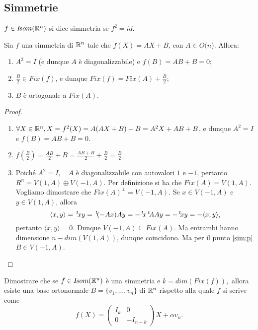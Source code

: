  
\subsection{Simmetrie}
 
 \begin{definition}
	$f\in I\!som( \mathbb R^n)$ si dice simmetria se $f^2=id$.
\end{definition}
 
 \begin{proposition}
 Sia $f$ una simmetria di $\mathbb R^n$ tale che $f(X)=AX+B$, con $A\in O(n$).
 Allora:
 \begin{enumerate}[label=\bf\Roman*)]
	\item $A^2=I$ (e dunque $A$ è diagonalizzabile) e $f(B)=AB+B=0$;\label{sim:p}
	\item $\frac{B}{2}\in Fix(f)$, e dunque $Fix(f)=Fix(A)+\frac{B}{2}$;
	\item $B$ è ortogonale a $Fix(A)$.
 \end{enumerate}
 \end{proposition}
 
 \begin{proof}
 \begin{enumerate}[label=\bf\Roman*)]
 \item $\forall X\in \mathbb R^n,  X=f^2(X)=A(AX+B)+B=A^2X+AB+B$, e dunque
 $A^2=I$ e $f(B)=AB+B=0$.
 \item $f(\frac{B}{2})=\frac{AB}{2}+B=\frac{AB+B}{2}+\frac{B}{2}=\frac{B}{2}$.
 \item Poiché $A^2=I,\quad A$ è diagonalizzabile con autovalori $1$ e $-1$, pertanto
 $R^n=V(1,A)\oplus V(-1,A)$. Per definizione si ha che $Fix(A)=V(1,A)$.
 Vogliamo dimostrare che $Fix(A)^{\bot}=V(-1,A)$.  Se $x\in V(-1,A)$ e $y\in V(1,A)$, allora 
  \[
   \langle x,y\rangle=\, ^{t}\!xy=\, ^{t}\!(-Ax)Ay=-\, ^{t}\!x\, ^{t}\!AAy=-\, ^{t}\!xy= -\langle x,y\rangle,
  \]
 pertanto $\langle x,y\rangle=0.$
 Dunque $V(-1,A)\subseteq Fix(A)$. Ma entrambi hanno dimensione
 $n-dim(V(1,A))$, dunque coincidono.
 Ma per il punto \ref{sim:p} $B\in V(-1,A)$.
 \end{enumerate}
 \end{proof}

  \begin{exercise}
Dimostrare che se $f\in I\!som( \mathbb R^n)$ è una simmetria e
 $k=dim(Fix(f)),$ allora esiste una base ortonormale $B=\{v_1,\ldots,v_n\}$ di $\mathbb R^n$ rispetto alla quale
 $f$ si scrive come
 \[
 f(X)=\left(
 \begin{array}{cc}
  I_k & 0\\
  0 & -I_{n-k}
 \end{array}
 \right)
 X+\alpha v_n.
 \]
 \end{exercise}
 

